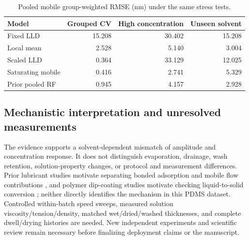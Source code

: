 \begin{table}[H]\centering\small\caption{Pooled mobile group-weighted RMSE (nm) under the same stress tests.}\begin{tabular}{lrrr}\toprule Model & Grouped CV & High concentration & Unseen solvent \\\midrule

Fixed LLD & 15.208 & 30.402 & 15.208 \\

Local mean & 2.528 & 5.140 & 3.004 \\

Scaled LLD & 0.364 & 33.129 & 12.025 \\

Saturating mobile & 0.416 & 2.741 & 5.329 \\

Prior pooled RF & 0.945 & 4.157 & 2.928 \\

\bottomrule\end{tabular}\end{table}


\subsection{Mechanistic interpretation and unresolved measurements}

The evidence supports a solvent-dependent mismatch of amplitude and concentration response. It does not distinguish evaporation, drainage, wash retention, solution-property changes, or protocol and measurement differences. Prior lubricant studies motivate separating bonded adsorption and mobile flow contributions \cite{merzlikine2005}, and polymer dip-coating studies motivate checking liquid-to-solid conversion \cite{zhang2022}; neither directly identifies the mechanism in this PDMS dataset. Controlled within-batch speed sweeps, measured solution viscosity/tension/density, matched wet/dried/washed thicknesses, and complete dwell/drying histories are needed. New independent experiments and scientific review remain necessary before finalizing deployment claims or the manuscript.
